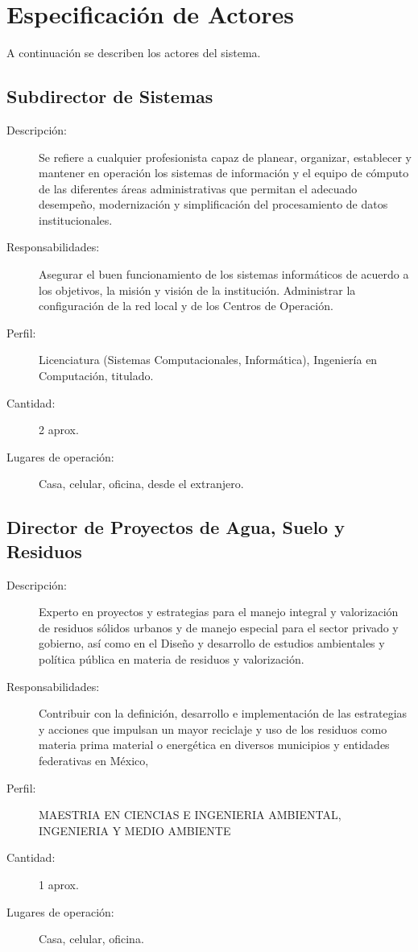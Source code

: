 \section{Especificación de Actores}
	 A continuación se describen los actores del sistema.


\subsection{Subdirector de Sistemas}

\begin{description}
	\item[Descripción: ] Se refiere a cualquier profesionista capaz de planear, organizar, establecer y mantener en operación los sistemas de	información y el equipo de cómputo de las diferentes áreas administrativas que
	permitan el adecuado desempeño, modernización y simplificación del
	procesamiento de datos institucionales.
	\item[Responsabilidades: ] Asegurar el buen funcionamiento de los sistemas informáticos de acuerdo a
	los objetivos, la misión y visión de la institución.
	Administrar la configuración de la red local y de los Centros de Operación. 
	\item[Perfil: ]Licenciatura (Sistemas Computacionales, Informática), Ingeniería en
	Computación, titulado. 
	\item[Cantidad: ] 2 aprox. 
	\item[Lugares de operación: ] Casa, celular, oficina, desde el extranjero.
\end{description}


\subsection{Director de Proyectos de Agua, Suelo y Residuos}

\begin{description}
	\item[Descripción: ] Experto en proyectos y estrategias para el manejo integral y valorización de residuos sólidos urbanos y de manejo especial para el sector privado y gobierno, así como en el Diseño y desarrollo de estudios ambientales y política pública en materia de residuos y valorización.
	\item[Responsabilidades: ] Contribuir con la definición, desarrollo e implementación de las estrategias y acciones que  impulsan un mayor reciclaje y uso de los residuos como materia prima material o energética en diversos municipios y entidades federativas en México,
	\item[Perfil: ]MAESTRIA EN CIENCIAS E INGENIERIA AMBIENTAL, INGENIERIA Y MEDIO AMBIENTE

	\item[Cantidad: ] 1 aprox. 
	\item[Lugares de operación: ] Casa, celular, oficina.
\end{description}

